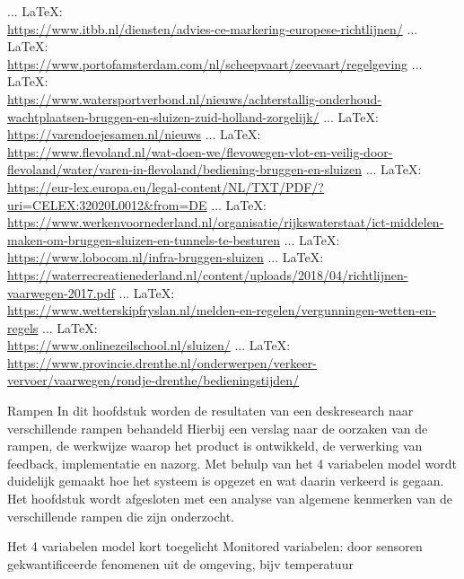 \begin{thebibliography}{99}
 ... \LaTeX:\\ \url{https://www.itbb.nl/diensten/advies-ce-markering-europese-richtlijnen/}
 ... \LaTeX:\\ \url{https://www.portofamsterdam.com/nl/scheepvaart/zeevaart/regelgeving}
 ... \LaTeX:\\ \url{https://www.watersportverbond.nl/nieuws/achterstallig-onderhoud-wachtplaatsen-bruggen-en-sluizen-zuid-holland-zorgelijk/}
 ... \LaTeX:\\ \url{https://varendoejesamen.nl/nieuws}
 ... \LaTeX:\\ \url{https://www.flevoland.nl/wat-doen-we/flevowegen-vlot-en-veilig-door-flevoland/water/varen-in-flevoland/bediening-bruggen-en-sluizen}
 ... \LaTeX:\\ \url{https://eur-lex.europa.eu/legal-content/NL/TXT/PDF/?uri=CELEX:32020L0012&from=DE}
 ... \LaTeX:\\ \url{https://www.werkenvoornederland.nl/organisatie/rijkswaterstaat/ict-middelen-maken-om-bruggen-sluizen-en-tunnels-te-besturen}
 ... \LaTeX:\\ \url{https://www.lobocom.nl/infra-bruggen-sluizen}
 ... \LaTeX:\\ \url{https://waterrecreatienederland.nl/content/uploads/2018/04/richtlijnen-vaarwegen-2017.pdf}
 ... \LaTeX:\\ \url{https://www.wetterskipfryslan.nl/melden-en-regelen/vergunningen-wetten-en-regels}
 ... \LaTeX:\\ \url{https://www.onlinezeilschool.nl/sluizen/}
 ... \LaTeX:\\ \url{https://www.provincie.drenthe.nl/onderwerpen/verkeer-vervoer/vaarwegen/rondje-drenthe/bedieningstijden/}





Rampen
In dit hoofdstuk worden de resultaten van een deskresearch naar verschillende rampen behandeld
Hierbij een verslag naar de oorzaken van de rampen, de werkwijze waarop het product is ontwikkeld, de verwerking van feedback, implementatie en nazorg.
Met behulp van het 4 variabelen model wordt duidelijk gemaakt hoe het systeem is opgezet en wat daarin verkeerd is gegaan.
Het  hoofdstuk wordt afgesloten met een analyse van algemene kenmerken van de verschillende rampen die zijn onderzocht.


Het 4 variabelen model kort toegelicht
Monitored variabelen: door sensoren gekwantificeerde fenomenen uit de omgeving, bijv temperatuur


\end{thebibliography}
